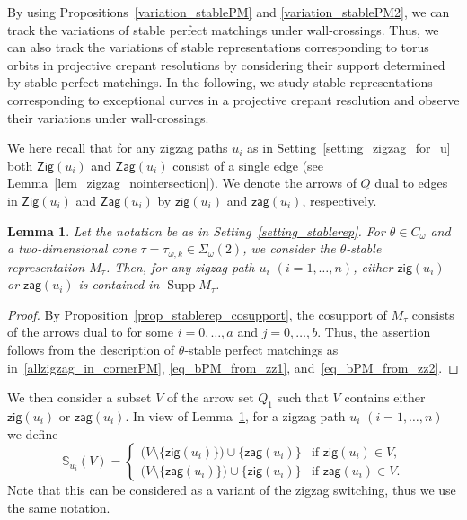 \documentclass[pdftex]{sigma}
\numberwithin{equation}{section}
\newtheorem{Lemma}[Theorem]{Lemma}
\theoremstyle{definition}
\newcommand{\BS}{\mathbb{S}}
\newcommand{\sfP}{\mathsf{P}}
\newcommand{\Supp}{\operatorname{Supp}}
\newcommand{\Zig}{\mathsf{Zig}}
\newcommand{\Zag}{\mathsf{Zag}}
\newcommand{\aZig}{\mathsf{zig}}
\newcommand{\aZag}{\mathsf{zag}}
\newcommand{\permII}{\omega}
\begin{document}
By using Propositions~\ref{variation_stablePM} and \ref{variation_stablePM2}, we can track the variations of
stable perfect matchings under wall-crossings.
Thus, we can also track the variations of stable representations corresponding to torus orbits in projective crepant resolutions
by considering their support determined by stable perfect matchings.
In the following, we study stable representations corresponding to exceptional curves in a projective crepant resolution
and observe their variations under wall-crossings.

We here recall that for any zigzag paths $u_i$ as in Setting~\ref{setting_zigzag_for_u}
both $\Zig(u_i)$ and $\Zag(u_i)$ consist of a single edge (see Lemma~\ref{lem_zigzag_nointersection}).
We denote the arrows of $Q$ dual to edges in $\Zig(u_i)$ and $\Zag(u_i)$ by $\aZig(u_i)$ and $\aZag(u_i)$, respectively.

\begin{Lemma}
\label{lem_zigzag_in_support}
Let the notation be as in Setting~{\rm \ref{setting_stablerep}}.
For $\theta\in C_\permII$ and a two-dimensional cone $\tau=\tau_{\permII, k}\in\Sigma_\permII(2)$, we consider the $\theta$-stable representation $M_\tau$.
Then, for any zigzag path $u_i$ $(i=1, \dots, n)$, either $\aZig(u_i)$ or $\aZag(u_i)$ is contained in $\Supp M_\tau$.
\end{Lemma}

\begin{proof}
By Proposition~\ref{prop_stablerep_cosupport}, the cosupport of $M_\tau$ consists of the arrows dual to \smash{$\sfP^\theta_{(i,0)}\cup\sfP^\theta_{(j,1)}$}
for some $i=0, \dots, a$ and $j=0, \dots, b$.
Thus, the assertion follows from the description of $\theta$-stable perfect matchings as in~\eqref{allzigzag_in_cornerPM}, \eqref{eq_bPM_from_zz1}, and~\eqref{eq_bPM_from_zz2}.
\end{proof}

We then consider a subset $V$ of the arrow set $Q_1$ such that $V$ contains either $\aZig(u_i)$ or $\aZag(u_i)$.
In view of Lemma~\ref{lem_zigzag_in_support}, for a zigzag path $u_i$ $(i=1, \dots, n)$ we define
\[
\BS_{u_i}(V)=
\begin{cases}
\big(V{\setminus}\{\aZig(u_i)\}\big) \cup \{\aZag(u_i)\}&\text{if $\aZig(u_i)\in V$,} \\
\big(V{\setminus}\{\aZag(u_i)\}\big) \cup \{\aZig(u_i)\}&\text{if $\aZag(u_i)\in V$.}
\end{cases}
\]
Note that this can be considered as a variant of the zigzag switching, thus we use the same notation.
\end{document}
